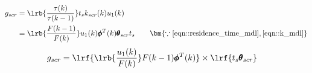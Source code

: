 \begin{align*}
        g_{scr} &= \lrb{\frac{\tau(k)}{\tau(k-1)}}
                t_s k_{scr}(k) u_1(k)\\
                &= \lrb{\frac{F(k-1)}{F(k)}} u_1(k) \pmb \phi^T(k) \pmb \theta_{scr} t_s
                \qquad \bm{\because \ref{eqn::residence_time_mdl}, \ref{eqn::k_mdl}}
\end{align*}
\begin{align}
        g_{scr} &= \lrf{\lrb{\frac{u_1(k)}{F(k)}} F(k-1) \pmb \phi^T(k)}
                \times \lrf{ t_s \pmb \theta_{scr} }
\end{align}
